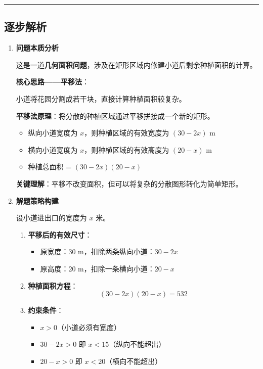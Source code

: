 \documentclass[UTF8]{ctexart}
\newenvironment{redenv}{\color{red}}{}
\newenvironment{detailedanalysis}{%
    \color{red}
    \begin{enumerate}[label=\textbf{第\arabic*步：}, leftmargin=*, align=left, itemsep=1.5ex]
}{%
    \end{enumerate}
}
\newenvironment{conceptbox}{%
    \begin{tcolorbox}[colback=red!5, colframe=red!50!black, title=概念解析, fonttitle=\bfseries]
}{%
    \end{tcolorbox}
}
\newcommand{\analysisrule}{\noindent\rule{\textwidth}{0.8pt}\vspace{-0.8em}}
\begin{document}
\begin{redenv}
\analysisrule
\subsection*{逐步解析}

\begin{detailedanalysis}
\item \textbf{问题本质分析}

这是一道\textbf{几何面积问题}，涉及在矩形区域内修建小道后剩余种植面积的计算。

\begin{conceptbox}
\textbf{核心思路——平移法}：

小道将花园分割成若干块，直接计算种植面积较复杂。

\textbf{平移法原理}：将分散的种植区域通过平移拼接成一个新的矩形。
\begin{itemize}
    \item 纵向小道宽度为 $x$，则种植区域的有效宽度为 $(30 - 2x)$ m
    \item 横向小道宽度为 $x$，则种植区域的有效高度为 $(20 - x)$ m
    \item 种植总面积 = $(30 - 2x)(20 - x)$
\end{itemize}

\textbf{关键理解}：平移不改变面积，但可以将复杂的分散图形转化为简单矩形。
\end{conceptbox}

\item \textbf{解题策略构建}

设小道进出口的宽度为 $x$ 米。

\begin{enumerate}[label=(\alph*)]
    \item \textbf{平移后的有效尺寸}：
    \begin{itemize}
        \item 原宽度：30 m，扣除两条纵向小道：$30 - 2x$
        \item 原高度：20 m，扣除一条横向小道：$20 - x$
    \end{itemize}
    
    \item \textbf{种植面积方程}：
    \[
    (30 - 2x)(20 - x) = 532
    \]
    
    \item \textbf{约束条件}：
    \begin{itemize}
        \item $x > 0$（小道必须有宽度）
        \item $30 - 2x > 0$ 即 $x < 15$（纵向不能超出）
        \item $20 - x > 0$ 即 $x < 20$（横向不能超出）
    \end{itemize}
\end{enumerate}


\end{detailedanalysis}
\end{redenv}
\end{document}
